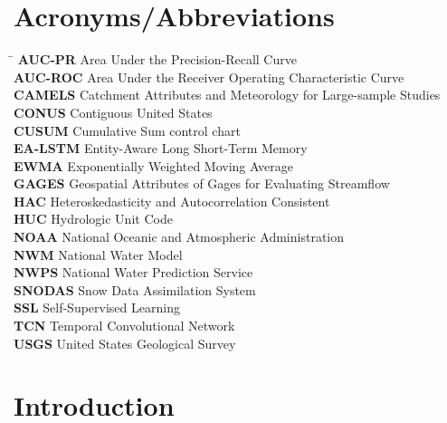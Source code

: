 \documentclass[12pt]{report}
\begin{document}
\chapter*{Acronyms/Abbreviations}
\begin{tabbing}
  \hspace{3cm} \= \kill
  \textbf{AUC-PR} \> Area Under the Precision-Recall Curve \\
  \textbf{AUC-ROC}\> Area Under the Receiver Operating Characteristic Curve \\
  \textbf{CAMELS} \> Catchment Attributes and Meteorology for Large-sample Studies \\
  \textbf{CONUS}  \> Contiguous United States \\
  \textbf{CUSUM}  \> Cumulative Sum control chart \\
  \textbf{EA-LSTM}\> Entity-Aware Long Short-Term Memory \\
  \textbf{EWMA}   \> Exponentially Weighted Moving Average \\
  \textbf{GAGES}  \> Geospatial Attributes of Gages for Evaluating Streamflow \\
  \textbf{HAC}    \> Heteroskedasticity and Autocorrelation Consistent \\
  \textbf{HUC}    \> Hydrologic Unit Code \\
  \textbf{NOAA}   \> National Oceanic and Atmospheric Administration \\
  \textbf{NWM}    \> National Water Model \\
  \textbf{NWPS}   \> National Water Prediction Service \\
  \textbf{SNODAS} \> Snow Data Assimilation System \\
  \textbf{SSL}    \> Self-Supervised Learning \\
  \textbf{TCN}    \> Temporal Convolutional Network \\
  \textbf{USGS}   \> United States Geological Survey \\
\end{tabbing}
\newpage

\setcounter{page}{1}

\chapter{Introduction}
\end{document}
